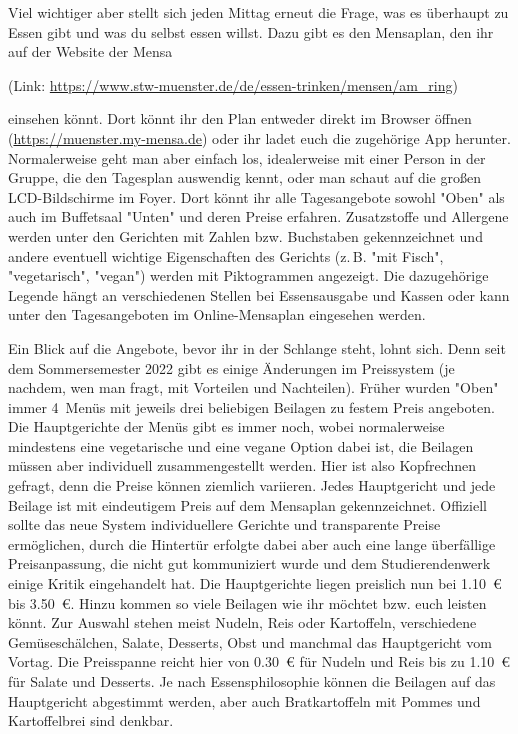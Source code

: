 \begin{multicols}{2}
Viel wichtiger aber stellt sich jeden Mittag erneut die Frage, was es überhaupt zu Essen gibt und was du selbst essen willst.
Dazu gibt es den Mensaplan, den ihr auf der Website der Mensa

\begin{center}
	(Link:
	\url{https://www.stw-muenster.de/de/essen-trinken/mensen/am_ring})
\end{center}

einsehen könnt. Dort könnt ihr den Plan entweder direkt im Browser öffnen (\url{https://muenster.my-mensa.de}) oder ihr ladet euch die zugehörige App herunter. Normalerweise geht man aber einfach los, idealerweise mit einer Person in der Gruppe, die den Tagesplan auswendig kennt, oder man schaut auf die
großen LCD-Bildschirme im Foyer. Dort könnt ihr alle Tagesangebote sowohl "Oben" als auch im Buffetsaal "Unten" und deren Preise erfahren. Zusatzstoffe und Allergene werden unter den Gerichten mit Zahlen bzw. Buchstaben gekennzeichnet und andere eventuell wichtige Eigenschaften des Gerichts (z.\,B. "mit Fisch", "vegetarisch", "vegan") werden mit Piktogrammen angezeigt. Die dazugehörige Legende hängt an verschiedenen Stellen bei Essensausgabe und Kassen oder kann unter den Tagesangeboten im Online-Mensaplan eingesehen werden.

Ein Blick auf die Angebote, bevor ihr in der Schlange steht, lohnt sich. Denn seit dem Sommersemester 2022 gibt es einige Änderungen im Preissystem (je nachdem, wen man fragt, mit Vorteilen und Nachteilen). Früher wurden "Oben" immer 4~Menüs mit jeweils drei beliebigen Beilagen zu festem Preis angeboten. Die Hauptgerichte der Menüs gibt es immer noch, wobei normalerweise mindestens eine vegetarische und eine vegane Option dabei ist, die Beilagen müssen aber individuell zusammengestellt werden. Hier ist also Kopfrechnen gefragt, denn die Preise können ziemlich variieren. Jedes Hauptgericht und jede Beilage ist mit eindeutigem Preis auf dem Mensaplan gekennzeichnet. Offiziell sollte das neue System individuellere Gerichte und transparente Preise ermöglichen, durch die Hintertür erfolgte dabei aber auch eine lange überfällige Preisanpassung, die nicht gut kommuniziert wurde und dem Studierendenwerk einige Kritik eingehandelt hat.
Die Hauptgerichte liegen preislich nun bei \SI{1,10}{\euro} bis \SI{3,50}{\euro}. Hinzu kommen so viele Beilagen wie ihr möchtet bzw. euch leisten könnt. Zur Auswahl stehen meist Nudeln, Reis oder Kartoffeln, verschiedene Gemüseschälchen, Salate, Desserts, Obst und manchmal das Hauptgericht vom Vortag. Die Preisspanne reicht hier von \SI{0,30}{\euro} für Nudeln und Reis bis zu \SI{1,10}{\euro} für Salate und Desserts. Je nach Essensphilosophie können die Beilagen auf das Hauptgericht abgestimmt werden, aber auch Bratkartoffeln mit Pommes und Kartoffelbrei sind denkbar.


\end{multicols}
